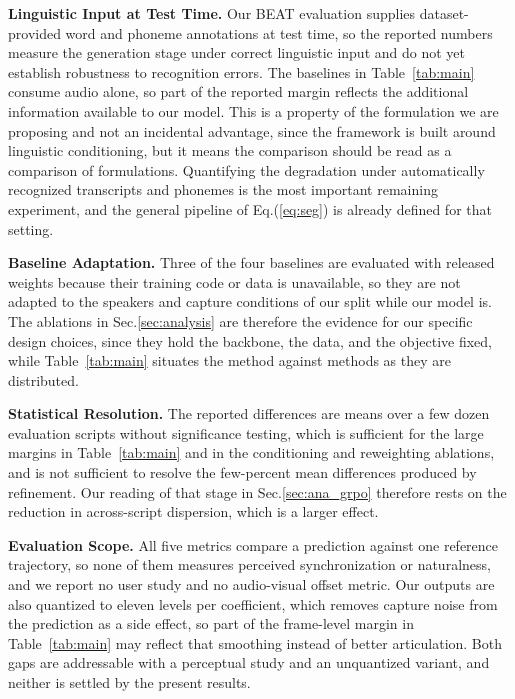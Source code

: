 \noindent\textbf{Linguistic Input at Test Time.}\quad
Our BEAT evaluation supplies dataset-provided word and phoneme annotations at test time, so the reported numbers measure the generation stage under correct linguistic input and do not yet establish robustness to recognition errors. The baselines in Table~\ref{tab:main} consume audio alone, so part of the reported margin reflects the additional information available to our model. This is a property of the formulation we are proposing and not an incidental advantage, since the framework is built around linguistic conditioning, but it means the comparison should be read as a comparison of formulations. Quantifying the degradation under automatically recognized transcripts and phonemes is the most important remaining experiment, and the general pipeline of Eq.(\ref{eq:seg}) is already defined for that setting.

\noindent\textbf{Baseline Adaptation.}\quad
Three of the four baselines are evaluated with released weights because their training code or data is unavailable, so they are not adapted to the speakers and capture conditions of our split while our model is. The ablations in Sec.\ref{sec:analysis} are therefore the evidence for our specific design choices, since they hold the backbone, the data, and the objective fixed, while Table~\ref{tab:main} situates the method against methods as they are distributed.

\noindent\textbf{Statistical Resolution.}\quad
The reported differences are means over a few dozen evaluation scripts without significance testing, which is sufficient for the large margins in Table~\ref{tab:main} and in the conditioning and reweighting ablations, and is not sufficient to resolve the few-percent mean differences produced by refinement. Our reading of that stage in Sec.\ref{sec:ana_grpo} therefore rests on the reduction in across-script dispersion, which is a larger effect.

\noindent\textbf{Evaluation Scope.}\quad
All five metrics compare a prediction against one reference trajectory, so none of them measures perceived synchronization or naturalness, and we report no user study and no audio-visual offset metric. Our outputs are also quantized to eleven levels per coefficient, which removes capture noise from the prediction as a side effect, so part of the frame-level margin in Table~\ref{tab:main} may reflect that smoothing instead of better articulation. Both gaps are addressable with a perceptual study and an unquantized variant, and neither is settled by the present results.

